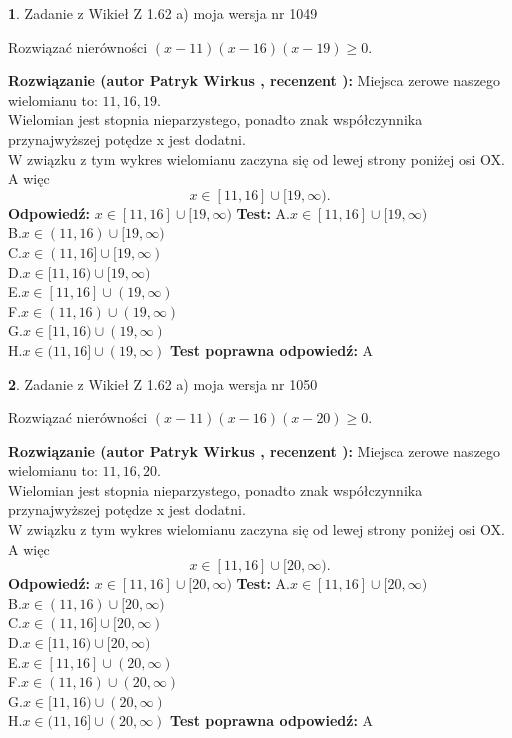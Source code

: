 \documentclass[12pt, a4paper]{article}
\theoremstyle{definition} %
\newtheorem{zad}{}
\newcommand{\zadStart}[1]{\begin{zad}#1\newline}
\newcommand{\zadStop}{\end{zad}}
\newcommand{\rozwStart}[2]{\noindent \textbf{Rozwiązanie (autor #1 , recenzent #2): }\newline}
\newcommand{\rozwStop}{\newline}
\newcommand{\odpStart}{\noindent \textbf{Odpowiedź:}\newline}
\newcommand{\odpStop}{\newline}
\newcommand{\testStart}{\noindent \textbf{Test:}\newline}
\newcommand{\testStop}{\newline}
\newcommand{\kluczStart}{\noindent \textbf{Test poprawna odpowiedź:}\newline}
\newcommand{\kluczStop}{\newline}
\begin{document}
\zadStart{Zadanie z Wikieł Z 1.62 a) moja wersja nr 1049}

Rozwiązać nierówności $(x-11)(x-16)(x-19)\ge0$.
\zadStop
\rozwStart{Patryk Wirkus}{}
Miejsca zerowe naszego wielomianu to: $11, 16, 19$.\\
Wielomian jest stopnia nieparzystego, ponadto znak współczynnika przy\linebreak najwyższej potędze x jest dodatni.\\ W związku z tym wykres wielomianu zaczyna się od lewej strony poniżej osi OX. A więc $$x \in [11,16] \cup [19,\infty).$$
\rozwStop
\odpStart
$x \in [11,16] \cup [19,\infty)$
\odpStop
\testStart
A.$x \in [11,16] \cup [19,\infty)$\\
B.$x \in (11,16) \cup [19,\infty)$\\
C.$x \in (11,16] \cup [19,\infty)$\\
D.$x \in [11,16) \cup [19,\infty)$\\
E.$x \in [11,16] \cup (19,\infty)$\\
F.$x \in (11,16) \cup (19,\infty)$\\
G.$x \in [11,16) \cup (19,\infty)$\\
H.$x \in (11,16] \cup (19,\infty)$
\testStop
\kluczStart
A
\kluczStop



\zadStart{Zadanie z Wikieł Z 1.62 a) moja wersja nr 1050}

Rozwiązać nierówności $(x-11)(x-16)(x-20)\ge0$.
\zadStop
\rozwStart{Patryk Wirkus}{}
Miejsca zerowe naszego wielomianu to: $11, 16, 20$.\\
Wielomian jest stopnia nieparzystego, ponadto znak współczynnika przy\linebreak najwyższej potędze x jest dodatni.\\ W związku z tym wykres wielomianu zaczyna się od lewej strony poniżej osi OX. A więc $$x \in [11,16] \cup [20,\infty).$$
\rozwStop
\odpStart
$x \in [11,16] \cup [20,\infty)$
\odpStop
\testStart
A.$x \in [11,16] \cup [20,\infty)$\\
B.$x \in (11,16) \cup [20,\infty)$\\
C.$x \in (11,16] \cup [20,\infty)$\\
D.$x \in [11,16) \cup [20,\infty)$\\
E.$x \in [11,16] \cup (20,\infty)$\\
F.$x \in (11,16) \cup (20,\infty)$\\
G.$x \in [11,16) \cup (20,\infty)$\\
H.$x \in (11,16] \cup (20,\infty)$
\testStop
\kluczStart
A
\kluczStop
\end{document}
